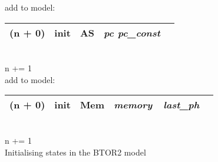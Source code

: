 \begin{algorithm}
    add to model:\\
    \begin{tabular}[h]{>{\ttfamily\color{UniRed}}r >{\ttfamily}l >{\ttfamily\color{UniGrey}}l >{\itshape\color{UniRed}}l >{\itshape} l}
        \hline
        \ttfamily
        (n + 0) & init & AS & pc pc\_const & \\
        \hline
    \end{tabular}\\
    \textcolor{UniRed}{n} += 1\\
    \BlankLine
    \BlankLine
    add to model:\\
    \begin{tabular}[h]{>{\ttfamily\color{UniRed}}r >{\ttfamily}l >{\ttfamily\color{UniGrey}}l >{\itshape\color{UniRed}}l >{\itshape} l}
        \hline
        \ttfamily
        (n + 0) & init & Mem & memory\ \ last\_ph & \\
        \hline
    \end{tabular}\\
    \textcolor{UniRed}{n} += 1\\
    \caption[Initialising states]{Initialising states in the BTOR2 model}\label{alg:initstate}
\end{algorithm}